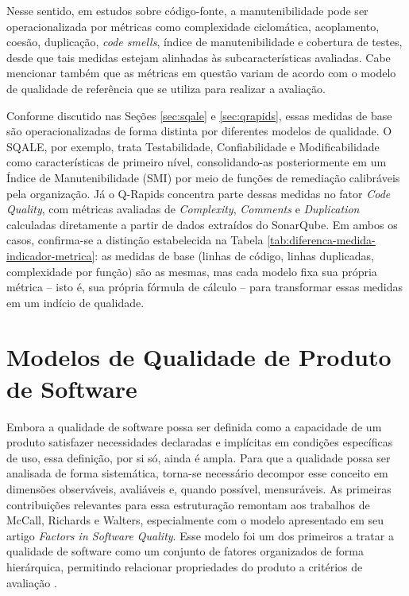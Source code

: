Nesse sentido, em estudos sobre código-fonte, a manutenibilidade pode ser operacionalizada por métricas como complexidade ciclomática, acoplamento, coesão, duplicação, \textit{code smells}, índice de manutenibilidade e cobertura de testes, desde que tais medidas estejam alinhadas às subcaracterísticas avaliadas. Cabe mencionar também que as métricas em questão variam de acordo com o modelo de qualidade de referência que se utiliza para realizar a avaliação.

Conforme discutido nas Seções \ref{sec:sqale} e \ref{sec:qrapids}, essas medidas de base são operacionalizadas de forma distinta por diferentes modelos de qualidade. O SQALE, por exemplo, trata Testabilidade, Confiabilidade e Modificabilidade como características de primeiro nível, consolidando-as posteriormente em um Índice de Manutenibilidade (SMI) por meio de funções de remediação calibráveis pela organização. Já o Q-Rapids concentra parte dessas medidas no fator \textit{Code Quality}, com métricas avaliadas de \textit{Complexity}, \textit{Comments} e \textit{Duplication} calculadas diretamente a partir de dados extraídos do SonarQube. Em ambos os casos, confirma-se a distinção estabelecida na Tabela \ref{tab:diferenca-medida-indicador-metrica}: as medidas de base (linhas de código, linhas duplicadas, complexidade por função) são as mesmas, mas cada modelo fixa sua própria métrica -- isto é, sua própria fórmula de cálculo -- para transformar essas medidas em um indício de qualidade.

\section{Modelos de Qualidade de Produto de Software}

Embora a qualidade de software possa ser definida como a capacidade de um produto satisfazer necessidades declaradas e implícitas em condições específicas de uso, essa definição, por si só, ainda é ampla. Para que a qualidade possa ser analisada de forma sistemática, torna-se necessário decompor esse conceito em dimensões observáveis, avaliáveis e, quando possível, mensuráveis. As primeiras contribuições relevantes para essa estruturação remontam aos trabalhos de McCall, Richards e Walters, especialmente com o modelo apresentado em seu artigo \textit{Factors in Software Quality}. Esse modelo foi um dos primeiros a tratar a qualidade de software como um conjunto de fatores organizados de forma hierárquica, permitindo relacionar propriedades do produto a critérios de avaliação \cite{mccall1977}. 

